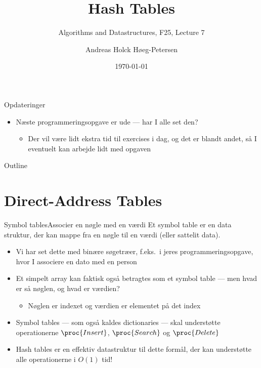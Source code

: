 \documentclass[aspectratio=1610]{beamer}
\title[ALG25 - Lecture 7]
{Hash Tables}
\subtitle
{Algorithms and Datastructures, F25, Lecture 7}
\author[Andreas H. Høeg-Petersen]
{Andreas Holck Høeg-Petersen}
\institute[AAU]{%
  Department of Computer Science\\
  Aalborg University
}
\date {\today}
\begin{document}
\begin{frame}
  \titlepage
\end{frame}

\begin{frame}{Opdateringer}{}
    \begin{itemize}[<+->]
        \small
        \item Næste programmeringsopgave er ude --- har I alle set den?
            \begin{itemize}
                \item Der vil være lidt ekstra tid til exercises i dag, og det
                    er blandt andet, så I eventuelt kan arbejde lidt med opgaven
            \end{itemize}
    \end{itemize}
\end{frame}


\begin{frame}{Outline}
  \tableofcontents
\end{frame}

\section{Direct-Address Tables}

\begin{frame}{Symbol tables}{Associer en nøgle med en værdi}
    Et \alert{symbol table} er en data struktur, der kan mappe fra en nøgle til
    en værdi (eller \alert{sattelit data}).

    \begin{itemize}[<+(1)->]
        \item Vi har set dette med \alert{binære søgetræer}, f.eks.\ i jeres
            programmeringsopgave, hvor I associere en dato med en person
        \item Et simpelt array kan faktisk også betragtes som et symbol table
            --- men hvad er så nøglen, og hvad er værdien?
            \begin{itemize}
                \item Nøglen er indexet og værdien er elementet på det index
            \end{itemize}
        \item Symbol tables --- som også kaldes \alert{dictionaries} --- skal
            understøtte operationerne $\proc{Insert}$, $\proc{Search}$ og
            $\proc{Delete}$
        \item Hash tables er en effektiv datastruktur til dette formål, der kan
            understøtte alle operationerne i $O(1)$ tid!
    \end{itemize}
\end{frame}
\end{document}
